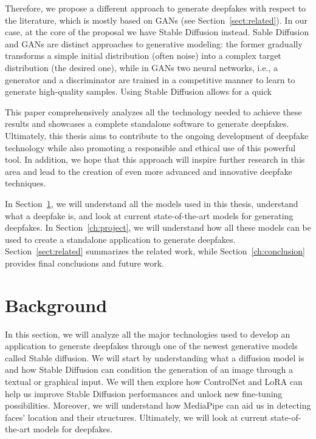 \documentclass[preprint]{elsarticle}
\begin{document}
Therefore, we propose a different approach to generate deepfakes with respect to the literature, which is mostly based on GANs (see Section~\ref{sect:related}). In our case, at the core of the proposal we have Stable Diffusion instead. Sable Diffusion and GANs are distinct approaches to generative modeling: the former gradually transforms a simple initial distribution (often noise) into a complex target distribution (the desired one), while in GANs two neural networks, i.e., a generator and a discriminator are trained in a competitive manner  to learn to generate high-quality samples. Using Stable Diffusion allows for a quick 

This paper comprehensively analyzes all the technology needed to achieve these  results and showcases a complete standalone software to generate deepfakes.  Ultimately, this thesis aims to contribute to the ongoing development of 
deepfake technology while also promoting a responsible and ethical use of this powerful tool.  In addition, we hope that this approach will inspire further research in this area and lead to the creation of even more advanced and innovative deepfake techniques.



In Section~\ref{sect:background}, we will understand all the models used in this thesis, understand what a deepfake is, and look at current state-of-the-art models for generating deepfakes.
In Section~\ref{ch:project}, we will understand how all these models can be used to create a standalone application to generate deepfakes. Section~\ref{sect:related} summarizes the related work, while Section~\ref{ch:conclusion} provides final conclusions and future work.


\section{Background}\label{sect:background}


In this section, we will analyze all the major technologies used to develop an application to generate 
deepfakes through one of the newest generative models called Stable diffusion. 
We will start by understanding what a diffusion model is and how Stable Diffusion can condition the 
generation of an image through a textual or graphical input. 
We will then explore how ControlNet and LoRA can help us improve Stable Diffusion performances and unlock new fine-tuning possibilities. 
Moreover, we will understand how MediaPipe can aid us in detecting faces' location and their structures. 
Ultimately, we will look at current state-of-the-art models for deepfakes.
\end{document}
